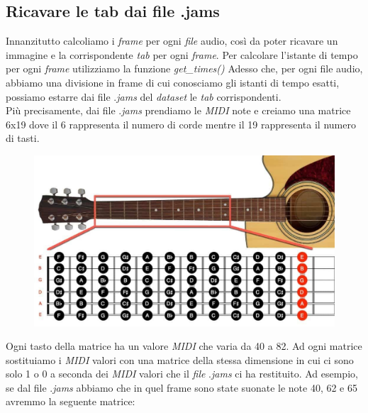 \subsection{Ricavare le tab dai file .jams}
Innanzitutto calcoliamo i \textit{frame} per ogni \textit{file} audio, così da poter ricavare un immagine e la corrispondente \textit{tab} per ogni \textit{frame}. Per calcolare l'istante di tempo per ogni \textit{frame} utilizziamo la funzione \textit{get\_times()}
\vspace*{2ex}
\vspace*{2ex}
Adesso che, per ogni file audio, abbiamo una divisione in frame di cui conosciamo gli istanti di tempo esatti, possiamo estarre dai file .\textit{jams} del \textit{dataset} le \textit{tab} corrispondenti.\\ Più precisamente, dai file .\textit{jams} prendiamo le \textit{MIDI} note e creiamo una matrice 6x19 dove il 6 rappresenta il numero di corde mentre il 19 rappresenta il numero di tasti.
\begin{figure}[H]
	\centering
	\includegraphics[scale=0.30]{./images/img12.jpg}
\end{figure}
Ogni tasto della matrice ha un valore \textit{MIDI} che varia da 40 a 82.
\vspace*{2ex}
\vspace*{2ex}
Ad ogni matrice sostituiamo i \textit{MIDI} valori con una matrice della stessa dimensione in cui ci sono solo 1 o 0 a seconda dei \textit{MIDI} valori che il \textit{file} .\textit{jams} ci ha restituito. Ad esempio, se dal file .\textit{jams} abbiamo che in quel frame sono state suonate le note 40, 62 e 65 avremmo la seguente matrice:
\vspace*{2ex}
\vspace*{2ex}
